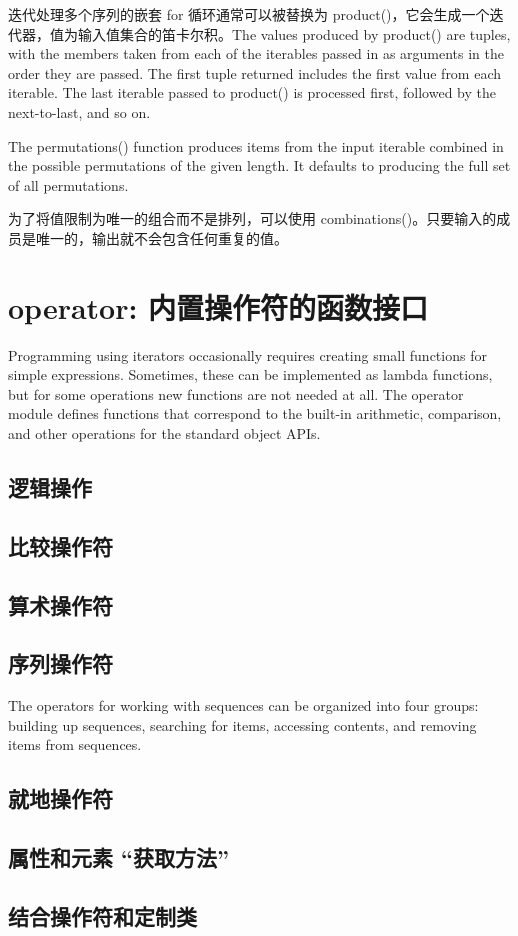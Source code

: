 迭代处理多个序列的嵌套 for 循环通常可以被替换为 product()，它会生成一个迭代器，值为输入值集合的笛卡尔积。The values produced by product() are tuples, with the members taken from each of the iterables passed in as arguments in the order they are passed. The first tuple returned includes the first value from each iterable. The last iterable passed to product() is processed first, followed by the next-to-last, and so on.

The permutations() function produces items from the input iterable combined in the possible permutations of the given length. It defaults to producing the full set of all permutations.

为了将值限制为唯一的组合而不是排列，可以使用 combinations()。只要输入的成员是唯一的，输出就不会包含任何重复的值。

\section{operator: 内置操作符的函数接口}
Programming using iterators occasionally requires creating small functions for simple expressions. Sometimes, these can be implemented as lambda functions, but for some operations new functions are not needed at all. The operator module defines functions that correspond to the built-in arithmetic, comparison, and other operations for the standard object APIs.
\subsection{逻辑操作}
\subsection{比较操作符}
\subsection{算术操作符}
\subsection{序列操作符}
The operators for working with sequences can be organized into four groups: building up sequences, searching for items, accessing contents, and removing items from sequences.
\subsection{就地操作符}
\subsection{属性和元素 “获取方法”}
\subsection{结合操作符和定制类}
